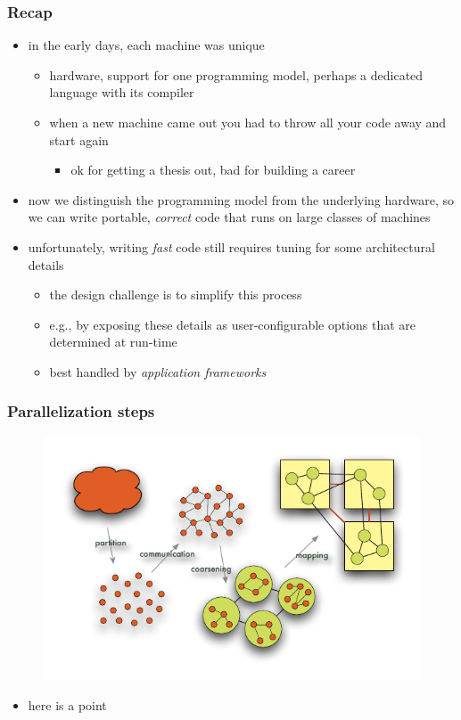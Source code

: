 \begin{frame}[fragile]
%
  \frametitle{Recap}
%
  \begin{itemize}
%
  \item in the early days, each machine was unique
    \begin{itemize}
      \item hardware, support for one programming model, perhaps a dedicated language with its
        compiler
%
      \item when a new machine came out you had to throw all your code away and start again
        \begin{itemize}
        \item ok for getting a thesis out, bad for building a career
        \end{itemize}
    \end{itemize}
%
  \item now we distinguish the programming model from the underlying hardware, so we can write
    portable, {\em correct} code that runs on large classes of machines
%
  \item unfortunately, writing {\em fast} code still requires tuning for some architectural
    details
    \begin{itemize}
      \item the design challenge is to simplify this process
      \item e.g., by exposing these details as user-configurable options that are determined at
        run-time
      \item best handled by {\em application frameworks}
    \end{itemize}
%
  \end{itemize}
%
\end{frame}

\begin{frame}[fragile]
%
  \frametitle{Parallelization steps}
%
  \begin{figure}
    \centering
    \includegraphics[scale=0.75]{figures/parallelization-steps.pdf}
    \label{fig:parallelization-steps}
  \end{figure}
%
  \begin{itemize}
%
    \item here is a point
%
  \end{itemize}
%
\end{frame}
